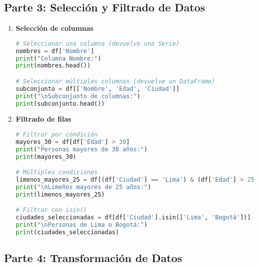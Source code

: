 \documentclass[a4paper,12pt]{article}
\begin{document}
\subsection{Parte 3: Selección y Filtrado de Datos}

\begin{enumerate}
    \item \textbf{Selección de columnas}
    \begin{lstlisting}[language=Python]
# Seleccionar una columna (devuelve una Serie)
nombres = df['Nombre']
print("Columna Nombre:")
print(nombres.head())

# Seleccionar múltiples columnas (devuelve un DataFrame)
subconjunto = df[['Nombre', 'Edad', 'Ciudad']]
print("\nSubconjunto de columnas:")
print(subconjunto.head())
    \end{lstlisting}

    \item \textbf{Filtrado de filas}
    \begin{lstlisting}[language=Python]
# Filtrar por condición
mayores_30 = df[df['Edad'] > 30]
print("Personas mayores de 30 años:")
print(mayores_30)

# Múltiples condiciones
limenos_mayores_25 = df[(df['Ciudad'] == 'Lima') & (df['Edad'] > 25)]
print("\nLimeños mayores de 25 años:")
print(limenos_mayores_25)

# Filtrar con isin()
ciudades_seleccionadas = df[df['Ciudad'].isin(['Lima', 'Bogotá'])]
print("\nPersonas de Lima o Bogotá:")
print(ciudades_seleccionadas)
    \end{lstlisting}
\end{enumerate}

\subsection{Parte 4: Transformación de Datos}
\end{document}
